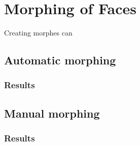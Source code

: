 \section{Morphing of Faces}
Creating morphes can
\subsection{Automatic morphing}

\subsubsection{Results}

\subsection{Manual morphing}

\subsubsection{Results}

